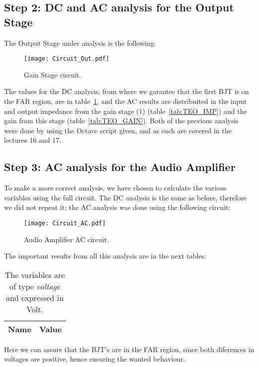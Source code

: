 \subsection{Step 2: DC and AC analysis for the Output Stage}

The Output Stage under analysis is the following:

\begin{figure}[h] \centering
\texttt{[image: Circuit\_Out.pdf]}
\caption{Gain Stage circuit.}
\label{fig:OUT_CIR}
\end{figure}

The values for the DC analysis, from where we garantee that the first BJT is on the FAR region, are in table~\ref{tab:TEO_DC}, and the AC results are distribuited in the input and output impedance from the gain stage (1) (table~\ref{tab:TEO_IMP}) and the gain from this stage (table~\ref{tab:TEO_GAIN}).
Both of the previous analysis were done by using the Octave script given, and as such are covered in the lectures 16 and 17.

\subsection{Step 3: AC analysis for the Audio Amplifier}

To make a more correct analysis, we have chosen to calculate the various variables using the full circuit. The DC analysis is the same as before, therefore we did not repeat it; the AC analysis was done using the following circuit:

\begin{figure}[h] \centering
\texttt{[image: Circuit\_AC.pdf]}
\caption{Audio Amplifier AC circuit.}
\label{fig:FULL_CIR}
\end{figure}

The important results from all this analysis are in the next tables:

\begin{table}[h]
  \centering
  \begin{tabular}{|l|r|}
    \hline    
    {\bf Name} & {\bf Value} \\ \hline
    
  \end{tabular}
  \caption{The variables are of type {\it voltage} and expressed in Volt.}
  \label{tab:TEO_DC}
\end{table}

Here we can assure that the BJT's are in the FAR region, since both diferences in voltages are positive, hence ensuring the wanted behaviour.

